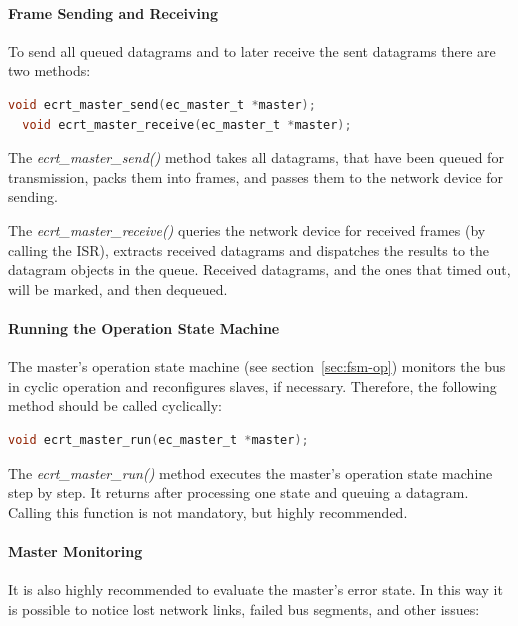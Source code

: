 \documentclass[a4paper,12pt,BCOR6mm,bibtotoc,idxtotoc]{scrbook}
\begin{document}
\paragraph{Frame Sending and Receiving}

To send all queued datagrams and to later receive the sent datagrams
there are two methods:

\begin{lstlisting}[gobble=2,language=C]
  void ecrt_master_send(ec_master_t *master);
  void ecrt_master_receive(ec_master_t *master);
\end{lstlisting}

The \textit{ecrt\_master\_send()} method takes all datagrams, that
have been queued for transmission, packs them into frames, and passes
them to the network device for sending.

The \textit{ecrt\_master\_receive()} queries the network device for
received frames (by calling the ISR), extracts received
datagrams and dispatches the results to the datagram objects in the
queue. Received datagrams, and the ones that timed out, will be
marked, and then dequeued.

\paragraph{Running the Operation State Machine}

The master's operation state machine (see section~\ref{sec:fsm-op})
monitors the bus in cyclic operation and reconfigures slaves, if
necessary. Therefore, the following method should be called
cyclically:

\begin{lstlisting}[gobble=2,language=C]
  void ecrt_master_run(ec_master_t *master);
\end{lstlisting}

The \textit{ecrt\_master\_run()} method executes the master's
operation state machine step by step. It returns after processing one
state and queuing a datagram. Calling this function is not mandatory,
but highly recommended.

\paragraph{Master Monitoring}

It is also highly recommended to evaluate the master's error state. In
this way it is possible to notice lost network links, failed bus
segments, and other issues:
\end{document}
